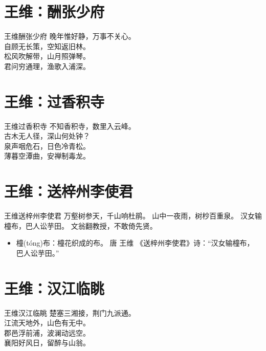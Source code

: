 \documentclass[12pt,oneside,a5paper]{book}
\begin{document}
\chapter{王维：酬张少府}
\begin{poemzh}{王维}{酬张少府}
晚年惟好静，万事不关心。\\
自顾无长策，空知返旧林。\\
松风吹解带，山月照弹琴。\\
君问穷通理，渔歌入浦深。\\ 
\end{poemzh}

\chapter{王维：过香积寺}
\begin{poemzh}{王维}{过香积寺}
不知香积寺，数里入云峰。\\
古木无人径，深山何处钟？\\
泉声咽危石，日色冷青松。\\
薄暮空潭曲，安禅制毒龙。\\ 
\end{poemzh}

\chapter{王维：送梓州李使君}
\begin{poemzh}{王维}{送梓州李使君}
万壑树参天，千山响杜鹃。
山中一夜雨，树杪百重泉。
汉女输橦布，巴人讼芋田。
文翁翻教授，不敢倚先贤。\\ 
\end{poemzh}

\begin{itemize}
\item 橦(tóng)布：橦花织成的布。 唐 王维 《送梓州李使君》诗：“汉女输橦布， 巴人讼芋田。”
\end{itemize}


\chapter{王维：汉江临眺}
\begin{poemzh}{王维}{汉江临眺}
楚塞三湘接，荆门九派通。\\
江流天地外，山色有无中。\\
郡邑浮前浦，波澜动远空。\\
襄阳好风日，留醉与山翁。\\ 
\end{poemzh}
\end{document}
